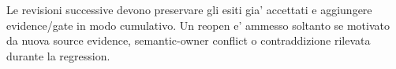 \documentclass[11pt,a4paper]{article}
\begin{document}
\begin{ddtacore}[title={Continuation invariant}]
Le revisioni successive devono preservare gli esiti gia' accettati e aggiungere evidence/gate in modo cumulativo. Un reopen e' ammesso soltanto se motivato da nuova source evidence, semantic-owner conflict o contraddizione rilevata durante la regression.
\end{ddtacore}
\end{document}
